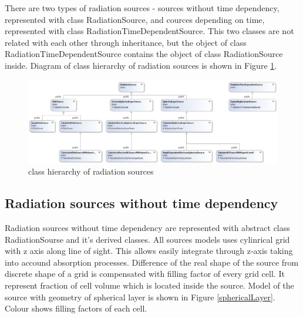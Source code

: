 There are two types of radiation sources - sources without time dependency, represented with class RadiationSource, and cources depending on time, represented with class RadiationTimeDependentSource. This two classes are not related with each other through inheritance, but the object of class RadiationTimeDependentSource contains the object of class RadiationSource inside. Diagram of class hierarchy of radiation sources is shown in Figure \ref{radiationSource}.

\begin{figure}[h]
	\centering
	\includegraphics[width=14.5 cm]{./fig/radiationSource2.png} 
	\caption{class hierarchy of radiation sources}
	\label{radiationSource}
\end{figure}

\subsection{Radiation sources without time dependency}\label{sourcesSection}
Radiation sources without time dependency are represented with abstract class RadiationSourse and it's derived classes. All sources models uses cylinrical grid with z axis along line of sight. This allows easily integrate through z-axis taking into accound absorption processes. Difference of the real shape of the source from discrete shape of a grid is compensated with filling factor of every grid cell. It represent fraction of cell volume which is located inside the source. Model of the source with geometry of spherical layer is shown in Figure \ref{sphericalLayer}. Colour shows filling factors of each cell.


